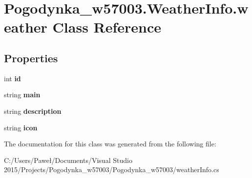 \hypertarget{class_pogodynka__w57003_1_1_weather_info_1_1weather}{}\section{Pogodynka\+\_\+w57003.\+Weather\+Info.\+weather Class Reference}
\label{class_pogodynka__w57003_1_1_weather_info_1_1weather}
\subsection*{Properties}
\begin{DoxyCompactItemize}
\item 
\mbox{\label{class_pogodynka__w57003_1_1_weather_info_1_1weather_ad13cdfb70892c179a30fd88187f56341}} 
int {\bfseries id}
\item 
\mbox{\label{class_pogodynka__w57003_1_1_weather_info_1_1weather_ae0f4146575ca595bb15444d1a3abfd1e}} 
string {\bfseries main}
\item 
\mbox{\label{class_pogodynka__w57003_1_1_weather_info_1_1weather_a16997ec7e57894a50cb62d907983580c}} 
string {\bfseries description}
\item 
\mbox{\label{class_pogodynka__w57003_1_1_weather_info_1_1weather_a6713039fb698f6049ae82536da925574}} 
string {\bfseries icon}
\end{DoxyCompactItemize}


The documentation for this class was generated from the following file\+:\begin{DoxyCompactItemize}
\item 
C\+:/\+Users/\+Paweł/\+Documents/\+Visual Studio 2015/\+Projects/\+Pogodynka\+\_\+w57003/\+Pogodynka\+\_\+w57003/weather\+Info.\+cs\end{DoxyCompactItemize}
